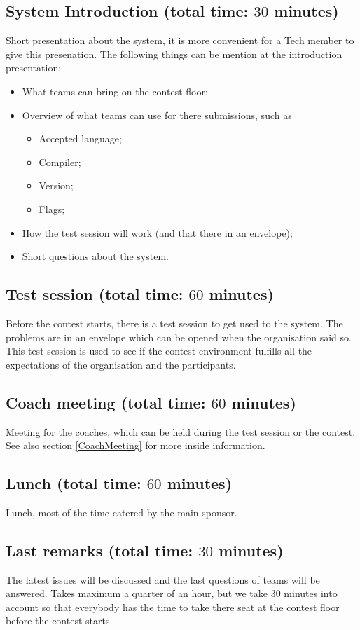 \subsection{System Introduction (total time: $30$ minutes)}
Short presentation about the system, it is more convenient for a Tech member to give this presenation. The following things can be mention at the introduction presentation:
\begin{itemize}
\item What teams can bring on the contest floor;
\item Overview of what teams can use for there submissions, such as
	\begin{itemize}
	\item Accepted language;
	\item Compiler;
	\item Version;
	\item Flags;
	\end{itemize}
\item How the test session will work (and that there in an envelope);
\item Short questions about the system.
\end{itemize}

\subsection{Test session (total time: $60$ minutes)}
Before the contest starts, there is a test session to get used to the system. The problems are in an envelope which can be opened when the organisation said so. This test session is used to see if the contest environment fulfills all the expectations of the organisation and the participants.

\subsection{Coach meeting (total time: $60$ minutes)}
Meeting for the coaches, which can be held during the test session or the contest. See also section \ref{CoachMeeting} for more inside information.

\subsection{Lunch (total time: $60$ minutes)}
Lunch, most of the time catered by the main sponsor.

\subsection{Last remarks (total time: $30$ minutes)}\label{lastRemarks}
The latest issues will be discussed and the last questions of teams will be answered. Takes maximum a quarter of an hour, but we take $30$ minutes into account so that everybody has the time to take there seat at the contest floor before the contest starts.

